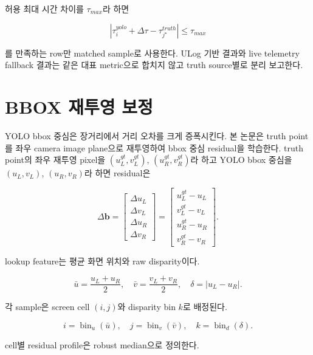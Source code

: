 \documentclass[10pt,conference]{IEEEtran}
\newcommand{\vect}[1]{\bm{#1}}
\begin{document}
허용 최대 시간 차이를 $\tau_{max}$라 하면

\begin{equation}
\left|
\tau_i^{yolo}
+\Delta\tau
-\tau_{j^\star}^{truth}
\right|
\le
\tau_{max}
\end{equation}

를 만족하는 row만 matched sample로 사용한다.
ULog 기반 결과와 live telemetry fallback 결과는 같은 대표 metric으로 합치지 않고 truth source별로 분리 보고한다.

\section{BBOX 재투영 보정}

YOLO bbox 중심은 장거리에서 거리 오차를 크게 증폭시킨다.
본 논문은 truth point를 좌우 camera image plane으로 재투영하여 bbox 중심 residual을 학습한다.
truth point의 좌우 재투영 pixel을 $(u_L^{gt},v_L^{gt})$, $(u_R^{gt},v_R^{gt})$라 하고 YOLO bbox 중심을 $(u_L,v_L)$, $(u_R,v_R)$라 하면 residual은

\begin{equation}
\Delta\vect{b}
=
\begin{bmatrix}
\Delta u_L\\
\Delta v_L\\
\Delta u_R\\
\Delta v_R
\end{bmatrix}
=
\begin{bmatrix}
u_L^{gt}-u_L\\
v_L^{gt}-v_L\\
u_R^{gt}-u_R\\
v_R^{gt}-v_R
\end{bmatrix}.
\label{eq:bbox_residual}
\end{equation}

lookup feature는 평균 화면 위치와 raw disparity이다.

\begin{equation}
\bar{u}=\frac{u_L+u_R}{2},
\quad
\bar{v}=\frac{v_L+v_R}{2},
\quad
\delta=|u_L-u_R|.
\end{equation}

각 sample은 screen cell $(i,j)$와 disparity bin $k$로 배정된다.

\begin{equation}
i = \operatorname{bin}_u(\bar{u}),
\quad
j = \operatorname{bin}_v(\bar{v}),
\quad
k = \operatorname{bin}_d(\delta).
\end{equation}

cell별 residual profile은 robust median으로 정의한다.
\end{document}
